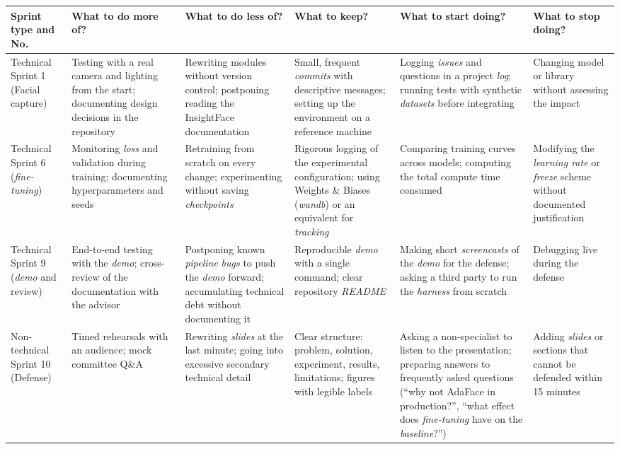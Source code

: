 \documentclass[
  11pt, %
]{charter}
\begin{document}
\begin{table}[htpb]
\small
\renewcommand{\arraystretch}{1.15}
\begin{tabular}{|>{\raggedright\arraybackslash}p{2.2cm}|
>{\raggedright\arraybackslash}p{2.2cm}|
>{\raggedright\arraybackslash}p{2.2cm}|
>{\raggedright\arraybackslash}p{2.2cm}|
>{\raggedright\arraybackslash}p{2.2cm}|
>{\raggedright\arraybackslash}p{2.2cm}|}
\hline
\rowcolor[HTML]{CCCCCC}
\textbf{Sprint type and No.} & \textbf{What to do more of?} & \textbf{What to do less of?} & \textbf{What to keep?} & \textbf{What to start doing?} & \textbf{What to stop doing?} \\
\hline
Technical Sprint 1 (Facial capture) & Testing with a real camera and lighting from the start; documenting design decisions in the repository & Rewriting modules without version control; postponing reading the InsightFace documentation & Small, frequent \textit{commits} with descriptive messages; setting up the environment on a reference machine & Logging \textit{issues} and questions in a project \textit{log}; running tests with synthetic \textit{datasets} before integrating & Changing model or library without assessing the impact \\
\hline
Technical Sprint 6 (\textit{fine-tuning}) & Monitoring \textit{loss} and validation during training; documenting hyperparameters and seeds & Retraining from scratch on every change; experimenting without saving \textit{checkpoints} & Rigorous logging of the experimental configuration; using Weights \& Biases (\textit{wandb}) or an equivalent for \textit{tracking} & Comparing training curves across models; computing the total compute time consumed & Modifying the \textit{learning rate} or \textit{freeze} scheme without documented justification \\
\hline
Technical Sprint 9 (\textit{demo} and review) & End-to-end testing with the \textit{demo}; cross-review of the documentation with the advisor & Postponing known \textit{pipeline} \textit{bugs} to push the \textit{demo} forward; accumulating technical debt without documenting it & Reproducible \textit{demo} with a single command; clear repository \textit{README} & Making short \textit{screencasts} of the \textit{demo} for the defense; asking a third party to run the \textit{harness} from scratch & Debugging live during the defense \\
\hline
Non-technical Sprint 10 (Defense) & Timed rehearsals with an audience; mock committee Q\&A & Rewriting \textit{slides} at the last minute; going into excessive secondary technical detail & Clear structure: problem, solution, experiment, results, limitations; figures with legible labels & Asking a non-specialist to listen to the presentation; preparing answers to frequently asked questions (``why not AdaFace in production?'', ``what effect does \textit{fine-tuning} have on the \textit{baseline}?'') & Adding \textit{slides} or sections that cannot be defended within 15 minutes \\
\hline
\end{tabular}
\end{table}
\end{document}

